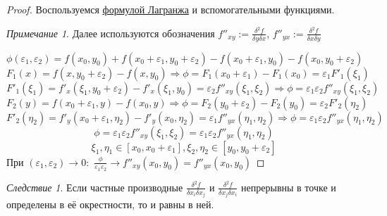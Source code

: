 \documentclass{article}
\theoremstyle{indented}
\theoremstyle{definition}
\theoremstyle{remark}
\newtheorem{remark}{Примечание}
\newtheorem{cons}{Следствие}
\begin{document}
\begin{proof}
    Воспользуемся \hyperlink{lagrange}{формулой Лагранжа} и вспомогательными функциями.
    

    \begin{remark}
        Далее используются обозначения
        $f''_{xy}:=\frac{\delta^2 f}{\delta y \delta x}$,
        $f''_{yx}:=\frac{\delta^2 f}{\delta x \delta y}$
    \end{remark}

    \[\phi(\varepsilon_1, \varepsilon_2) =
        f(x_0, y_0)+f(x_0+\varepsilon_1, y_0+\varepsilon_2)
        -f(x_0+\varepsilon_1, y_0)-f(x_0, y_0+\varepsilon_2)\]
    \[F_1(x)=f(x,y_0+\varepsilon_2)-f(x,y_0)
        \Rightarrow \phi = F_1(x_0+\varepsilon_1)-F_1(x_0) = \varepsilon_1 F'_1(\xi_1)\]
    \[F'_1(\xi_1)=f'_x(\xi _1, y_0+\varepsilon_2)-f'_x(\xi_1,y_0)=
        \varepsilon_2 f''_{xy}(\xi_1, \xi_2)
        \Rightarrow \phi = \varepsilon_1 \varepsilon_2 f''_{xy}(\xi_1, \xi_2)\]
    \[F_2(y)=f(x_0+\varepsilon_1,y)-f(x_0,y)
        \Rightarrow \phi = F_2(y_0+\varepsilon_2)-F_2(y_0) = \varepsilon_2 F'_2(\eta_2)\]
    \[F'_2(\eta_2)=f'_y(x_0+\varepsilon_1,\eta_2)-f'_y(x_0,\eta_2)=
        \varepsilon_1 f''_{yx}(\eta_1, \eta_2)
        \Rightarrow \phi = \varepsilon_1 \varepsilon_2 f''_{yx}(\eta_1, \eta_2)\]
    \[\phi = \varepsilon_1 \varepsilon_2 f''_{xy}(\xi_1, \xi_2) = \varepsilon_1 \varepsilon_2 f''_{yx}(\eta _1, \eta _2) \]
    \[\xi_1,\eta_1 \in [x_0, x_0+\varepsilon_1], \xi_2,\eta_2 \in [y_0, y_0+\varepsilon_2]\]
    При $(\varepsilon_1, \varepsilon_2) \to 0:$
    $\frac{\phi}{\varepsilon_1 \varepsilon_2} \to f''_{xy}(x_0, y_0) = f''_{yx}(x_0, y_0)$
\end{proof}

\begin{cons}
    Если частные производные $\frac{\delta^2 f}{\delta x_i \delta x_j}$ и $\frac{\delta^2 f}{\delta x_j \delta x_i}$ непрерывны в точке и определены в её окрестности, то и равны в ней.
\end{cons}
\end{document}
